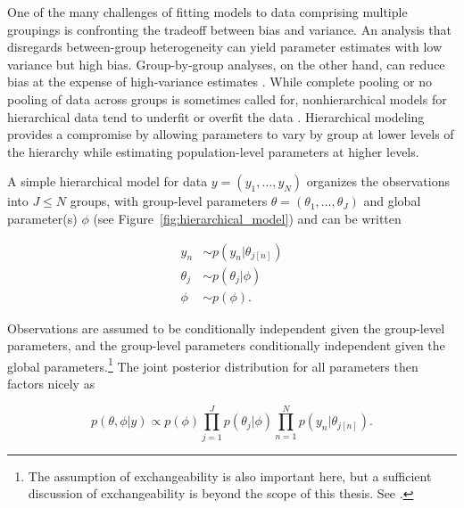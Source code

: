 
One of the many challenges of fitting models to data comprising multiple groupings is 
confronting the tradeoff between bias and variance. An analysis that disregards between-group 
heterogeneity can yield parameter estimates with low variance but high bias. Group-by-group 
analyses, on the other hand, can reduce bias at the expense of high-variance estimates . While complete pooling or no pooling of data across 
groups is sometimes called for, nonhierarchical models for hierarchical data tend to underfit 
or overfit the data . Hierarchical modeling provides a 
compromise by allowing parameters to vary by group at lower levels of the hierarchy while 
estimating population-level parameters at higher levels. 

A simple hierarchical model for data $y = (y_1, \dots, y_N)$ organizes the observations into $J \leq N$ groups, 
with group-level parameters $\theta = (\theta_1, \dots, \theta_J)$ and global parameter(s) $\phi$ 
(see Figure~\ref{fig:hierarchical_model}) and can be written

\begin{align*}
y_n &\sim p(y_n | \theta_{j[n]}) \\
\theta_j &\sim p(\theta_j | \phi) \\
\phi &\sim p(\phi).
\end{align*}

\noindent Observations are assumed to be conditionally independent given the group-level parameters, and the group-level parameters conditionally independent given the global parameters.\footnote{
The assumption of exchangeability is also important here, but a sufficient discussion of exchangeability 
is beyond the scope of this thesis. See .} The joint posterior distribution for all parameters then factors nicely as

\begin{equation*}
 p(\theta, \phi | y) \propto p(\phi) \prod_{j=1}^J p(\theta_j | \phi) \prod_{n=1}^N p(y_n | \theta_{j[n]}). 
\end{equation*} 

